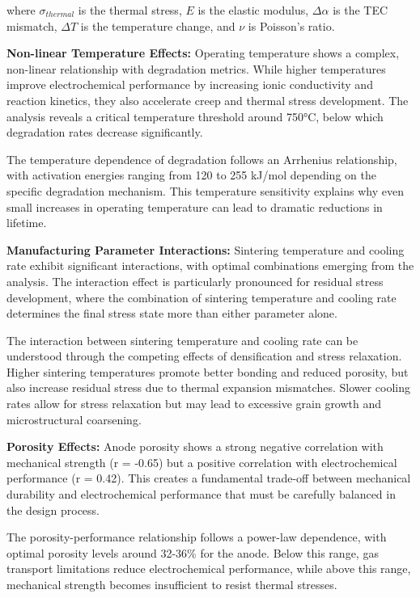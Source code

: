 \documentclass[conference]{IEEEtran}
\begin{document}
where $\sigma_{thermal}$ is the thermal stress, $E$ is the elastic modulus, $\Delta \alpha$ is the TEC mismatch, $\Delta T$ is the temperature change, and $\nu$ is Poisson's ratio.

\textbf{Non-linear Temperature Effects:} Operating temperature shows a complex, non-linear relationship with degradation metrics. While higher temperatures improve electrochemical performance by increasing ionic conductivity and reaction kinetics, they also accelerate creep and thermal stress development. The analysis reveals a critical temperature threshold around 750°C, below which degradation rates decrease significantly.

The temperature dependence of degradation follows an Arrhenius relationship, with activation energies ranging from 120 to 255 kJ/mol depending on the specific degradation mechanism. This temperature sensitivity explains why even small increases in operating temperature can lead to dramatic reductions in lifetime.

\textbf{Manufacturing Parameter Interactions:} Sintering temperature and cooling rate exhibit significant interactions, with optimal combinations emerging from the analysis. The interaction effect is particularly pronounced for residual stress development, where the combination of sintering temperature and cooling rate determines the final stress state more than either parameter alone.

The interaction between sintering temperature and cooling rate can be understood through the competing effects of densification and stress relaxation. Higher sintering temperatures promote better bonding and reduced porosity, but also increase residual stress due to thermal expansion mismatches. Slower cooling rates allow for stress relaxation but may lead to excessive grain growth and microstructural coarsening.

\textbf{Porosity Effects:} Anode porosity shows a strong negative correlation with mechanical strength (r = -0.65) but a positive correlation with electrochemical performance (r = 0.42). This creates a fundamental trade-off between mechanical durability and electrochemical performance that must be carefully balanced in the design process.

The porosity-performance relationship follows a power-law dependence, with optimal porosity levels around 32-36\% for the anode. Below this range, gas transport limitations reduce electrochemical performance, while above this range, mechanical strength becomes insufficient to resist thermal stresses.
\end{document}

